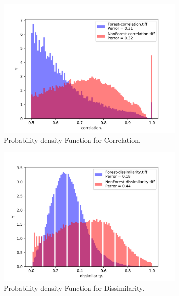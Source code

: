\begin{figure}[H]
\begin{subfigure}[b]{0.4\linewidth}
    \includegraphics[width=\linewidth]{Chapter4/glcm_textures/correlation_hist.png}
     \caption{Probability density Function for Correlation.}
  \end{subfigure}
  \centering
  \begin{subfigure}[b]{0.4\linewidth}
    \includegraphics[width=\linewidth]{Chapter4/glcm_textures/dissimilarity_hist.png}
     \caption{Probability density Function for Dissimilarity.}
  \end{subfigure}
  \centering
  \begin{subfigure}[b]{0.4\linewidth}

\end{subfigure}
\end{figure}
